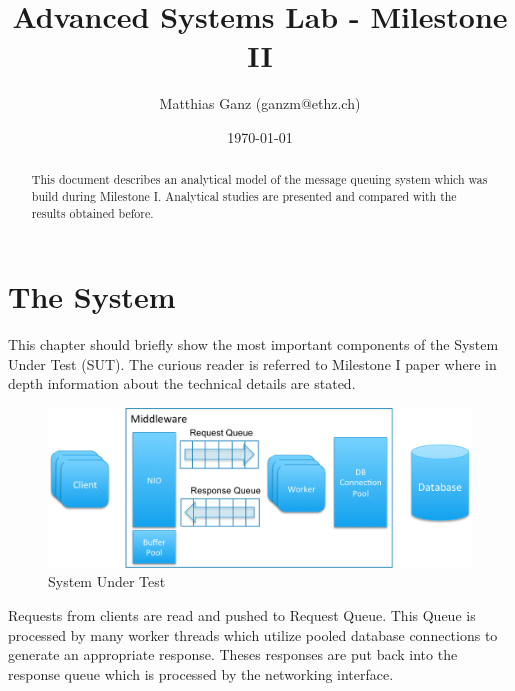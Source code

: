 \documentclass[a4paper]{article}
\title{Advanced Systems Lab - Milestone II}
\author{Matthias Ganz (ganzm@ethz.ch)}
\date{\today}
\begin{document}
\maketitle

\pagebreak

\tableofcontents

\pagebreak

\begin{abstract}

This document describes an analytical model of the message queuing system which was build during Milestone I. Analytical studies are presented and compared with the results obtained before.


\end{abstract}

\pagebreak

\section{The System}

This chapter should briefly show the most important components of the System Under Test (SUT). The curious reader is referred to Milestone I paper where in depth information about the technical details are stated.



\begin{figure}[H]
	\begin{center}
    \includegraphics[scale=0.4]{../drawings/broker-threading.png}
  \end{center}
  \caption{System Under Test}
  \label{fig:sut}
\end{figure}


Requests from clients are read and pushed to Request Queue. This Queue is processed by many worker threads which utilize pooled database connections to generate an appropriate response. Theses responses are put back into the response queue which is processed by the networking interface.
\end{document}
